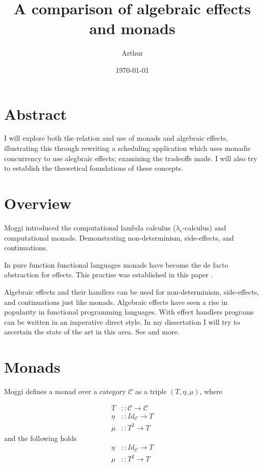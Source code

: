 \documentclass[a4paper,10pt]{article}
\title{A comparison of algebraic effects and monads}
\author{Arthur}
\date{\today}
\begin{document}
\maketitle
\section{Abstract}

I will explore both the relation and use of monads and algebraic effects,
illustrating this through rewriting a scheduling application which uses
monadic concurrency to use alegbraic effects; examining the tradeoffs made.
I will also try to establish the theoretical foundations of these concepts.

\section{Overview}
Moggi \cite{Moggi:hc} introduced the computational lambda calculus (${\lambda}_c$-calculus)
and computational monads. Demonstrating non-determinism, side-effects, and continuations.

In pure function functional languages monads have become the de facto abstraction for effects.
This practise was established in this paper \cite{wadler1990}.

Algebraic effects \cite{plotkin2001adequacy} and their handlers \cite{Plotkin:2001jr}
can be used for non-determinism, side-effects, and continuations just like monads.
Algebraic effects have seen a rise in popularity in functional programming languages.
With effect handlers programs can be written in an imperative direct style.
In my dissertation I will try to ascertain the state of the art in this area.
See \cite{Bauer:2013fn, leijen:16, Lindley:2016vz, Dolan:2017} and more.

\section{Monads}

Moggi \cite{moggi} defines a monad over a category $\mathcal{C}$ as a triple
$(T,\eta,\mu)$, where

\begin{equation}
  \begin{split}
    T    &:: \mathcal{C} \rightarrow \mathcal{C} \\
    \eta &:: Id_{\mathcal{C}} \rightarrow T       \\
    \mu  &:: T^{2} \rightarrow T
  \end{split}
\end{equation}
and the following holds
\begin{equation}
  \begin{split}
    \eta &:: Id_{\mathcal{C}} \rightarrow T       \\
    \mu  &:: T^{2} \rightarrow T
  \end{split}
\end{equation}
\end{document}
